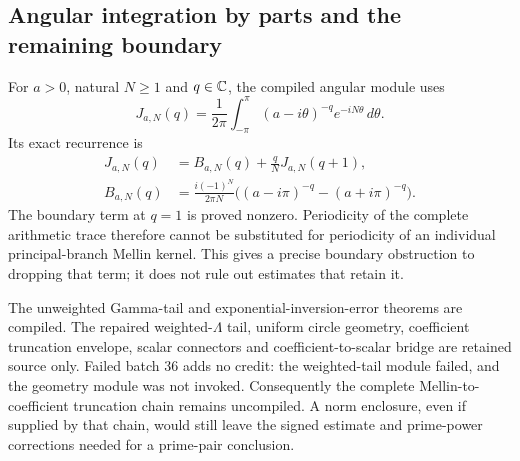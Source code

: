 \subsection{Angular integration by parts and the remaining boundary}

For $a>0$, natural $N\geq1$ and $q\in\mathbb{C}$, the compiled angular module
uses
\begin{equation}
 J_{a,N}(q)=\frac1{2\pi}\int_{-\pi}^{\pi}
                  (a-i\theta)^{-q}e^{-iN\theta}\,d\theta.
\end{equation}
Its exact recurrence is
\begin{align}
 J_{a,N}(q)&=B_{a,N}(q)+\frac qN J_{a,N}(q+1),\\
 B_{a,N}(q)&=\frac{i(-1)^N}{2\pi N}
           \bigl((a-i\pi)^{-q}-(a+i\pi)^{-q}\bigr).
 \label{eq:angular-boundary}
\end{align}
The boundary term at $q=1$ is proved nonzero. Periodicity of the complete
arithmetic trace therefore cannot be substituted for periodicity of an
individual principal-branch Mellin kernel. This gives a precise boundary
obstruction to dropping that term; it does not rule out estimates that
retain it.

The unweighted Gamma-tail and exponential-inversion-error theorems are
compiled. The repaired weighted-$\Lambda$ tail, uniform circle geometry,
coefficient truncation envelope, scalar connectors and coefficient-to-scalar
bridge are retained source only. Failed batch 36 adds no credit: the
weighted-tail module failed, and the geometry module was not invoked.
Consequently the complete Mellin-to-coefficient truncation chain remains
uncompiled. A norm enclosure, even if supplied by that chain, would still
leave the signed estimate and prime-power corrections needed for a
prime-pair conclusion.
